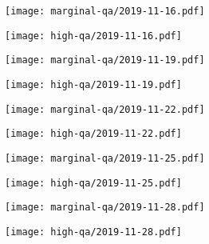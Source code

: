 \documentclass{article}
\begin{document}
\begin{figure}[H]
	\ContinuedFloat
	\centering
	\begin{subfigure}{0.48\linewidth}
		\texttt{[image: marginal-qa/2019-11-16.pdf]}
	\end{subfigure}
	\begin{subfigure}{0.48\linewidth}
		\texttt{[image: high-qa/2019-11-16.pdf]}
	\end{subfigure}
	\begin{subfigure}{0.48\linewidth}
		\texttt{[image: marginal-qa/2019-11-19.pdf]}
	\end{subfigure}
	\begin{subfigure}{0.48\linewidth}
		\texttt{[image: high-qa/2019-11-19.pdf]}
	\end{subfigure}
	\begin{subfigure}{0.48\linewidth}
		\texttt{[image: marginal-qa/2019-11-22.pdf]}
	\end{subfigure}
	\begin{subfigure}{0.48\linewidth}
		\texttt{[image: high-qa/2019-11-22.pdf]}
	\end{subfigure}
	\begin{subfigure}{0.48\linewidth}
		\texttt{[image: marginal-qa/2019-11-25.pdf]}
	\end{subfigure}
	\begin{subfigure}{0.48\linewidth}
		\texttt{[image: high-qa/2019-11-25.pdf]}
	\end{subfigure}
	\begin{subfigure}{0.48\linewidth}
		\texttt{[image: marginal-qa/2019-11-28.pdf]}
	\end{subfigure}
	\begin{subfigure}{0.48\linewidth}
		\texttt{[image: high-qa/2019-11-28.pdf]}
	\end{subfigure}
\end{figure}
\end{document}
